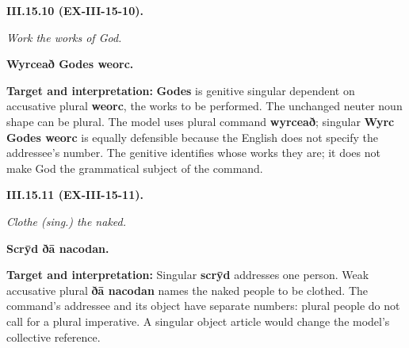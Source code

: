 \par\begin{minipage}{\linewidth}\raggedright
\textbf{III.15.10 (EX-III-15-10).}

\emph{Work the works of God.}

\textbf{Wyrceað Godes weorc.}

\textbf{Target and interpretation:} \textbf{Godes} is genitive singular dependent on accusative plural \textbf{weorc}, the works to be performed. The unchanged neuter noun shape can be plural. The model uses plural command \textbf{wyrceað}; singular \textbf{Wyrc Godes weorc} is equally defensible because the English does not specify the addressee's number. The genitive identifies whose works they are; it does not make God the grammatical subject of the command.

\end{minipage}\par\addvspace{4pt}

\par\begin{minipage}{\linewidth}\raggedright
\textbf{III.15.11 (EX-III-15-11).}

\emph{Clothe (sing.) the naked.}

\textbf{Scrȳd ðā nacodan.}

\textbf{Target and interpretation:} Singular \textbf{scrȳd} addresses one person. Weak accusative plural \textbf{ðā nacodan} names the naked people to be clothed. The command's addressee and its object have separate numbers: plural people do not call for a plural imperative. A singular object article would change the model's collective reference.

\end{minipage}\par\addvspace{4pt}

